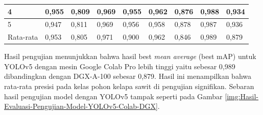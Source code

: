 \begin{singlespace}
\begin{table}[H]
\begin{tabular}{|p{1cm}|p{1cm}p{1cm}|p{1cm}p{1cm}|p{1cm}p{1cm}|p{1cm}p{1cm}|}
			4                                              & \multicolumn{1}{p{1cm}|}{0,955}                                    & 0,809     & \multicolumn{1}{p{1cm}|}{0,969}                                    & 0,955     & \multicolumn{1}{p{1cm}|}{0,962}                                    & 0,876     & \multicolumn{1}{p{1cm}|}{0,988}                                     & 0,934     \\ \hline
			
			5                                              & \multicolumn{1}{p{1cm}|}{0,947}                                    & 0,811     & \multicolumn{1}{p{1cm}|}{0,969}                                    & 0,956     & \multicolumn{1}{p{1cm}|}{0,958}                                    & 0,878     & \multicolumn{1}{p{1cm}|}{0,987}                                     & 0,936     \\ \hline
			
			Rata-rata                                      & \multicolumn{1}{p{1cm}|}{0,953}                                    & 0,805     & \multicolumn{1}{p{1cm}|}{0,971}                                    & 0,900     & \multicolumn{1}{p{1cm}|}{0,962}                                    & 0,846     & \multicolumn{1}{p{1cm}|}{0,989}                                     & 0,879     \\ \hline
			
		\end{tabular}
	\end{table}
\end{singlespace}

Hasil pengujian menunjukkan bahwa hasil best \textit{mean average} (best mAP) untuk YOLOv5 dengan mesin Google Colab Pro lebih tinggi yaitu sebesar 0,989 dibandingkan dengan DGX-A-100 sebesar 0,879. Hasil ini menampilkan bahwa rata-rata presisi pada kelas pohon kelapa sawit di pengujian signifikan. Sebaran hasil pengujian model dengan YOLOv5 tampak seperti pada Gambar \ref{img:Hasil-Evaluasi-Pengujian-Model-YOLOv5-Colab-DGX}.


